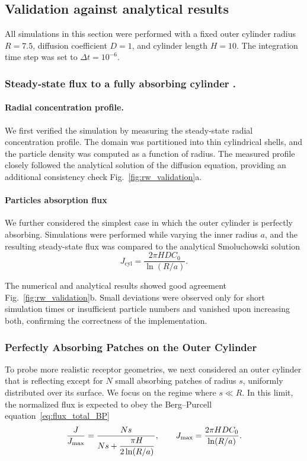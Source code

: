 \subsection{Validation against analytical results}\label{sec:rw_validation}
All simulations in this section were performed with a fixed outer cylinder radius $R = 7.5$, diffusion coefficient $D = 1$, and cylinder length $H = 10$.
The integration time step was set to $\Delta t = 10^{-6}$.

\subsubsection{Steady-state flux to a fully absorbing cylinder .}\label{sec:rw_absorbing}

\paragraph{Radial concentration profile.}
We first verified the simulation by measuring the steady-state radial concentration profile.
The domain was partitioned into thin cylindrical shells, and the particle density was computed as a function of radius.
The measured profile closely followed the analytical solution of the diffusion equation, providing an additional consistency check Fig.~\ref{fig:rw_validation}a.

\paragraph{Particles absorption flux}
We further considered the simplest case in which the outer cylinder is perfectly absorbing.
Simulations were performed while varying the inner radius $a$, and the resulting steady-state flux was compared to the analytical Smoluchowski solution
\begin{equation}
    J_{\mathrm{cyl}} = \frac{2\pi H D C_{0}}{\ln(R/a)}.
    \label{eq:J_cyl}
\end{equation}

The numerical and analytical results showed good agreement Fig.~\ref{fig:rw_validation}b.
Small deviations were observed only for short simulation times or insufficient particle numbers and vanished upon increasing both, confirming the correctness of the implementation.

\subsubsection{Perfectly Absorbing Patches on the Outer Cylinder}\label{sec:rw_patches}
To probe more realistic receptor geometries, we next considered an outer cylinder that is reflecting except for $N$ small absorbing patches of radius $s$, uniformly distributed over its surface.
We focus on the regime where $s \ll R$.
In this limit, the normalized flux is expected to obey the Berg--Purcell equation~\eqref{eq:flux_total_BP}
\begin{equation}
    \frac{J}{J_{\mathrm{max}}} = \frac{Ns}{Ns + \dfrac{\pi H}{2 \ln(R/a)}}, \qquad J_{\mathrm{max}} = \frac{2\pi H D C_{0}}{\ln(R/a)}.
    \label{eq:J_patches_normalized}
\end{equation}

